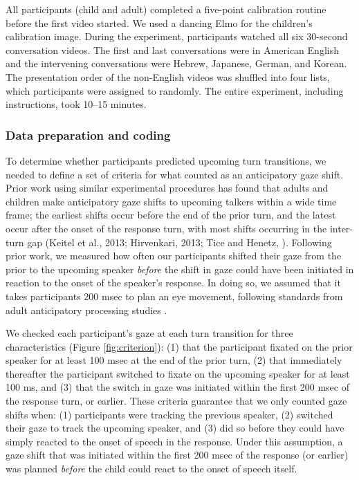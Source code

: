 \documentclass[authoryear, 12pt]{elsarticle}
\begin{document}
All participants (child and adult) completed a five-point calibration routine before the first video started. We used a dancing Elmo for the children's calibration image. During the experiment, participants watched all six 30-second conversation videos. The first and last conversations were in American English and the intervening conversations were Hebrew, Japanese, German, and Korean. The presentation order of the non-English videos was shuffled into four lists, which participants were assigned to randomly. The entire experiment, including instructions, took 10--15 minutes.

\subsubsection*{Data preparation and coding}
\label{sec:algorithm}

To determine whether participants predicted upcoming turn transitions, we needed to define a set of criteria for what counted as an anticipatory gaze shift. Prior work using similar experimental procedures has found that adults and children make anticipatory gaze shifts to upcoming talkers within a wide time frame; the earliest shifts occur before the end of the prior turn, and the latest occur after the onset of the response turn, with most shifts occurring in the inter-turn gap (Keitel et al., 2013; Hirvenkari, 2013; Tice and Henetz, \citeyear{TiceHenetz11}). Following prior work, we measured how often our participants shifted their gaze from the prior to the upcoming speaker \textit{before} the shift in gaze could have been initiated in reaction to the onset of the speaker's response. In doing so, we assumed that it takes participants 200 msec to plan an eye movement, following standards from adult anticipatory processing studies \citep[e.g., ][]{kamide2003}.

We checked each participant's gaze at each turn transition for three characteristics (Figure \ref{fig:criterion}): (1) that the participant fixated on the prior speaker for at least 100 msec at the end of the prior turn, (2) that immediately thereafter the participant switched to fixate on the upcoming speaker for at least 100 ms, and (3) that the switch in gaze was initiated within the first 200 msec of the response turn, or earlier. These criteria guarantee that we only counted gaze shifts when: (1) participants were tracking the previous speaker, (2) switched their gaze to track the upcoming speaker, and (3) did so before they could have simply reacted to the onset of speech in the response. Under this assumption, a gaze shift that was initiated within the first 200 msec of the response (or earlier) was planned \textit{before} the child could react to the onset of speech itself.
\end{document}
